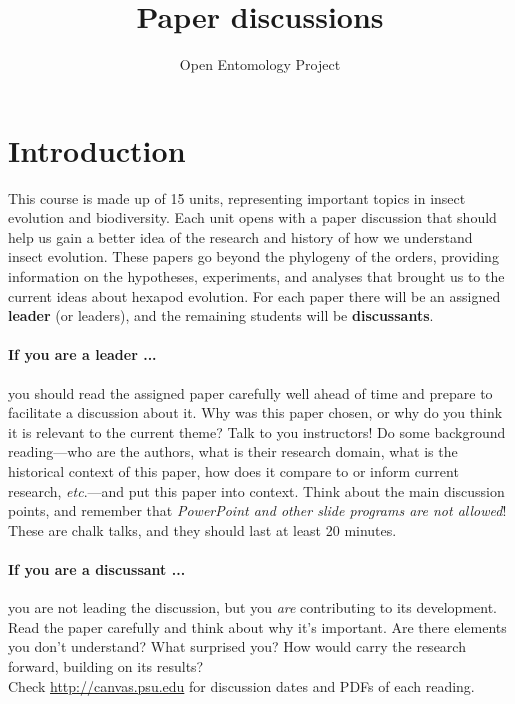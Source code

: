 \documentclass[11pt,letterpaper]{article}
\title{Paper discussions}
\author{Open Entomology Project}
\begin{document}
\cleanlookdateon %
\maketitle
\thispagestyle{fancy}
\section*{Introduction}
This course is made up of 15 units, representing important topics in insect evolution and biodiversity. Each unit opens with a paper discussion that should help us gain a better idea of the research and history of how we understand insect evolution. These papers go beyond the phylogeny of the orders, providing information on the hypotheses, experiments, and analyses that brought us to the current ideas about hexapod evolution. For each paper there will be an assigned \textbf{leader} (or leaders), and the remaining students will be \textbf{discussants}. 

\paragraph*{If you are a leader ...} you should read the assigned paper carefully well ahead of time and prepare to facilitate a discussion about it. Why was this paper chosen, or why do you think it is relevant to the current theme? Talk to you instructors! Do some background reading---who are the authors, what is their research domain, what is the historical context of this paper, how does it compare to or inform current research, \textit{etc}.---and put this paper into context. Think about the main discussion points, and remember that \textit{PowerPoint and other slide programs are not allowed}! These are chalk talks, and they should last at least 20 minutes.

\paragraph*{If you are a discussant ...} you are not leading the discussion, but you \textit{are} contributing to its development. Read the paper carefully and think about why it's important. Are there elements you don't understand? What surprised you? How would carry the research forward, building on its results?\\

\noindent{}Check \url{http://canvas.psu.edu} for discussion dates and PDFs of each reading.


%
%
\end{document}
